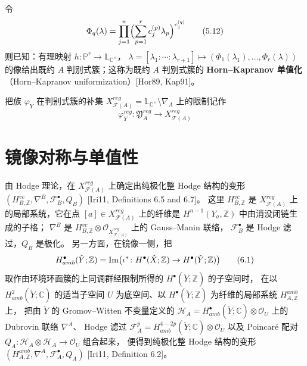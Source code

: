 令
\begin{equation}
  \Phi_{q}(\lambda)=\prod_{j=1}^{n}\Bigl(\sum_{p=1}^{r}c_{j}^{(p)}\lambda_{p}\Bigr)^{c_{j}^{(q)}} \tag{5.12}
\end{equation}
则已知：有理映射 $h\colon\mathbb{P}^{r}\to\mathbb{L}_{\mathbb{C}^{\times}}$，
$\lambda=[\lambda_{1}:\cdots:\lambda_{r+1}]\mapsto(\Phi_{1}(\lambda_{1}),\dots,\Phi_{r}(\lambda))$
的像给出既约 $A$ 判别式簇；这称为既约 $A$ 判别式簇的
\textbf{Horn–Kapranov 单值化}（Horn–Kapranov uniformization）[Hor89, Kap91]。

把族 $\varphi_{Y}$ 在判别式簇的补集
$X_{\mathcal{F}(A)}^{reg}=\mathbb{L}_{\mathbb{C}^{\times}}\setminus\nabla_{A}$ 上的限制记作
\begin{equation}
  \varphi_{Y}^{reg}\colon\mathfrak{Y}_{A}^{reg}\to X_{\mathcal{F}(A)}^{reg} \tag{5.13}
\end{equation}

\section{镜像对称与单值性}

由 Hodge 理论，在 $X_{\mathcal{F}(A)}^{reg}$ 上确定出纯极化整 Hodge 结构的变形
$(H_{B,\mathbb{Z}}^{vc},\nabla^{B},\mathscr{F}_{B}^{\bullet},Q_{B})$ [Iri11, Definitions 6.5 and 6.7]。
这里 $H_{B,\mathbb{Z}}^{vc}$ 是 $X_{\mathcal{F}(A)}^{reg}$ 上的局部系统，它在点
$[a]\in X_{\mathcal{F}(A)}^{reg}$ 上的纤维是 $H^{n-1}(Y_{a},\mathbb{Z})$ 中由消没闭链生成的子格；
$\nabla^{B}$ 是 $H_{B,\mathbb{Z}}^{vc}\otimes\mathcal{O}_{X_{\mathcal{F}(A)}^{reg}}$ 上的 Gauss–Manin 联络，
$\mathscr{F}_{B}^{\bullet}$ 是 Hodge 滤过，$Q_{B}$ 是极化。
另一方面，在镜像一侧，把
\begin{equation}
  H^{\bullet}_{amb}(\check{Y};\mathbb{Z})=\operatorname{Im}\bigl(\iota^{*}\colon
  H^{\bullet}(\check{X};\mathbb{Z})\to H^{\bullet}(\check{Y};\mathbb{Z})\bigr) \tag{6.1}
\end{equation}
取作由环境环面簇的上同调群经限制所得的 $H^{\bullet}(\check{Y};\mathbb{Z})$ 的子空间时，
在以 $H_{amb}^{2}(\check{Y};\mathbb{C})$ 的适当子空间 $U$ 为底空间、以
$H^{\bullet}(\check{Y};\mathbb{Z})$ 为纤维的局部系统 $H_{A,\mathbb{Z}}^{amb}$ 上，
把由 $\check{Y}$ 的 Gromov–Witten 不变量定义的
$\mathscr{H}_{A}=H^{\bullet}_{amb}(\check{Y};\mathbb{C})\otimes\mathcal{O}_{U}$ 上的 Dubrovin 联络 $\nabla^{A}$、
Hodge 滤过 $\mathscr{F}_{A}^{p}=H_{amb}^{4-2p}(\check{Y};\mathbb{C})\otimes\mathcal{O}_{U}$
以及 Poincaré 配对 $Q_{A}\colon\mathscr{H}_{A}\otimes\mathscr{H}_{A}\to\mathcal{O}_{U}$ 组合起来，
便得到纯极化整 Hodge 结构的变形
$(H_{A,\mathbb{Z}}^{amb},\nabla^{A},\mathscr{F}_{A}^{\bullet},Q_{A})$ [Iri11, Definition 6.2]。

